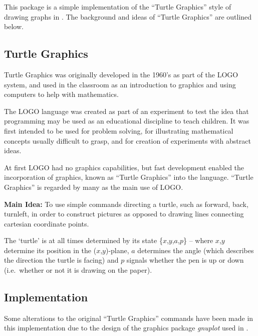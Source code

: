 
\newcommand{\turtlesyntax}[1]{\textsl{SYNTAX: } \texttt{#1}}
\newcommand{\turtleabb}[1]{\textsl{Abbreviated form: } \texttt{#1}}

This package is a simple implementation of the ``Turtle Graphics''
style of drawing graphs in {\REDUCE}. The background and ideas of
``Turtle Graphics'' are outlined below.

\subsection{Turtle Graphics}

Turtle Graphics was originally developed in the 1960's as part of the
LOGO system, and used in the classroom as an introduction to graphics
and using computers to help with mathematics.

The LOGO language was created as part of an experiment to test the idea
that programming may be used as an educational discipline to teach children.
It was first intended to be used for problem solving, for illustrating
mathematical concepts usually difficult to grasp, and for creation of
experiments with abstract ideas.

At first LOGO had no graphics capabilities, but fast development enabled
the incorporation of graphics, known as ``Turtle Graphics'' into the
language. ``Turtle Graphics'' is regarded by many as the main use of
LOGO.


\textbf{Main Idea: } To use simple commands directing a turtle, such as
forward, back, turnleft, in order to construct pictures as opposed to
drawing lines connecting cartesian coordinate points.

The `turtle' is at all times determined by its state \{$x$,$y$,$a$,$p$\} --
where $x$,$y$ determine its position in the \mbox{($x$,$y$)-plane}, $a$
determines the angle (which describes the direction the turtle is
facing) and $p$ signals whether the pen is up or down (i.e.\ whether or
not it is drawing on the paper).


\subsection{Implementation}
Some alterations to the original ``Turtle Graphics'' commands have been
made in this implementation due to the design of the graphics package
\emph{gnuplot} used in {\REDUCE}.

